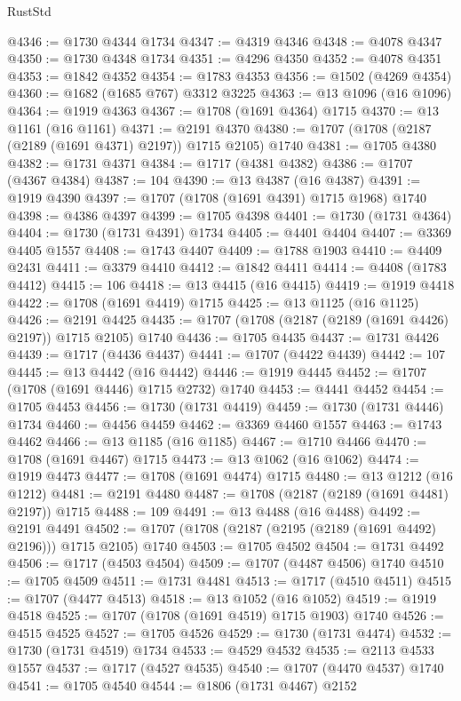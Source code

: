 \begin{lexlean}{RustStd}
\begin{coremodule}
@4346 := @1730 @4344 @1734
@4347 := @4319 @4346
@4348 := @4078 @4347
@4350 := @1730 @4348 @1734
@4351 := @4296 @4350
@4352 := @4078 @4351
@4353 := @1842 @4352
@4354 := @1783 @4353
@4356 := @1502 (@4269 @4354)
@4360 := @1682 (@1685 @767) @3312 @3225
@4363 := @13 @1096 (@16 @1096)
@4364 := @1919 @4363
@4367 := @1708 (@1691 @4364) @1715
@4370 := @13 @1161 (@16 @1161)
@4371 := @2191 @4370
@4380 := @1707 (@1708 (@2187 (@2189 (@1691 @4371) @2197)) @1715 @2105) @1740
@4381 := @1705 @4380
@4382 := @1731 @4371
@4384 := @1717 (@4381 @4382)
@4386 := @1707 (@4367 @4384)
@4387 := 104
@4390 := @13 @4387 (@16 @4387)
@4391 := @1919 @4390
@4397 := @1707 (@1708 (@1691 @4391) @1715 @1968) @1740
@4398 := @4386 @4397
@4399 := @1705 @4398
@4401 := @1730 (@1731 @4364)
@4404 := @1730 (@1731 @4391) @1734
@4405 := @4401 @4404
@4407 := @3369 @4405 @1557
@4408 := @1743 @4407
@4409 := @1788 @1903
@4410 := @4409 @2431
@4411 := @3379 @4410
@4412 := @1842 @4411
@4414 := @4408 (@1783 @4412)
@4415 := 106
@4418 := @13 @4415 (@16 @4415)
@4419 := @1919 @4418
@4422 := @1708 (@1691 @4419) @1715
@4425 := @13 @1125 (@16 @1125)
@4426 := @2191 @4425
@4435 := @1707 (@1708 (@2187 (@2189 (@1691 @4426) @2197)) @1715 @2105) @1740
@4436 := @1705 @4435
@4437 := @1731 @4426
@4439 := @1717 (@4436 @4437)
@4441 := @1707 (@4422 @4439)
@4442 := 107
@4445 := @13 @4442 (@16 @4442)
@4446 := @1919 @4445
@4452 := @1707 (@1708 (@1691 @4446) @1715 @2732) @1740
@4453 := @4441 @4452
@4454 := @1705 @4453
@4456 := @1730 (@1731 @4419)
@4459 := @1730 (@1731 @4446) @1734
@4460 := @4456 @4459
@4462 := @3369 @4460 @1557
@4463 := @1743 @4462
@4466 := @13 @1185 (@16 @1185)
@4467 := @1710 @4466
@4470 := @1708 (@1691 @4467) @1715
@4473 := @13 @1062 (@16 @1062)
@4474 := @1919 @4473
@4477 := @1708 (@1691 @4474) @1715
@4480 := @13 @1212 (@16 @1212)
@4481 := @2191 @4480
@4487 := @1708 (@2187 (@2189 (@1691 @4481) @2197)) @1715
@4488 := 109
@4491 := @13 @4488 (@16 @4488)
@4492 := @2191 @4491
@4502 := @1707 (@1708 (@2187 (@2195 (@2189 (@1691 @4492) @2196))) @1715 @2105) @1740
@4503 := @1705 @4502
@4504 := @1731 @4492
@4506 := @1717 (@4503 @4504)
@4509 := @1707 (@4487 @4506) @1740
@4510 := @1705 @4509
@4511 := @1731 @4481
@4513 := @1717 (@4510 @4511)
@4515 := @1707 (@4477 @4513)
@4518 := @13 @1052 (@16 @1052)
@4519 := @1919 @4518
@4525 := @1707 (@1708 (@1691 @4519) @1715 @1903) @1740
@4526 := @4515 @4525
@4527 := @1705 @4526
@4529 := @1730 (@1731 @4474)
@4532 := @1730 (@1731 @4519) @1734
@4533 := @4529 @4532
@4535 := @2113 @4533 @1557
@4537 := @1717 (@4527 @4535)
@4540 := @1707 (@4470 @4537) @1740
@4541 := @1705 @4540
@4544 := @1806 (@1731 @4467) @2152

\end{coremodule}
\end{lexlean}
